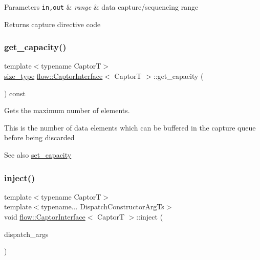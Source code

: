 \begin{DoxyParams}[1]{Parameters}
\mbox{\tt in,out}  & {\em range} & data capture/sequencing range\\
\hline
\end{DoxyParams}
\begin{DoxyReturn}{Returns}
capture directive code 
\end{DoxyReturn}
\mbox{\label{classflow_1_1_captor_interface_a84ee393ca53d595bb20057445334eb78}} 
\subsubsection{\texorpdfstring{get\+\_\+capacity()}{get\_capacity()}}
{\footnotesize\ttfamily template$<$typename CaptorT$>$ \\
\hyperlink{classflow_1_1_captor_interface_a62db6a158eebcb377e63ede6a1f1a8c6}{size\+\_\+type} \hyperlink{classflow_1_1_captor_interface}{flow\+::\+Captor\+Interface}$<$ CaptorT $>$\+::get\+\_\+capacity (\begin{DoxyParamCaption}{ }\end{DoxyParamCaption}) const\hspace{0.3cm}{\ttfamily [inline]}}



Gets the maximum number of elements. 

This is the number of data elements which can be buffered in the capture queue before being discarded

\begin{DoxySeeAlso}{See also}
{\ttfamily \hyperlink{classflow_1_1_captor_interface_a8068310b1ece5c53a11252919a62355a}{set\+\_\+capacity}} 
\end{DoxySeeAlso}
\mbox{\label{classflow_1_1_captor_interface_a2a7e884dff7564478a6ae060b37351f0}} 
\subsubsection{\texorpdfstring{inject()}{inject()}}
{\footnotesize\ttfamily template$<$typename CaptorT$>$ \\
template$<$typename... Dispatch\+Constructor\+Arg\+Ts$>$ \\
void \hyperlink{classflow_1_1_captor_interface}{flow\+::\+Captor\+Interface}$<$ CaptorT $>$\+::inject (\begin{DoxyParamCaption}\item[{Dispatch\+Constructor\+Arg\+Ts \&\&...}]{dispatch\+\_\+args }\end{DoxyParamCaption})\hspace{0.3cm}{\ttfamily [inline]}}



